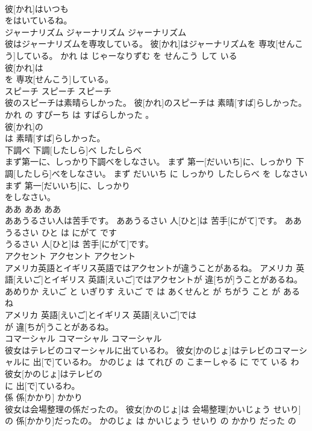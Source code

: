 \documentclass[8pt]{extreport}
\begin{document}
\begin{CJK}{UTF8}{min}
\\	彼[かれ]はいつも
\\	をはいているね。			
\\	ジャーナリズム	ジャーナリズム	ジャーナリズム	
\\	彼はジャーナリズムを専攻している。	彼[かれ]はジャーナリズムを 専攻[せんこう]している。	かれ は じゃーなりずむ を せんこう して いる	
\\	彼[かれ]は
\\	を 専攻[せんこう]している。			
\\	スピーチ	スピーチ	スピーチ	
\\	彼のスピーチは素晴らしかった。	彼[かれ]のスピーチは 素晴[すば]らしかった。	かれ の すぴーち は すばらしかった 。	
\\	彼[かれ]の
\\	は 素晴[すば]らしかった。			
\\	下調べ	下調[したしら]べ	したしらべ	
\\	まず第一に、しっかり下調べをしなさい。	まず 第一[だいいち]に、しっかり 下調[したしら]べをしなさい。	まず だいいち に しっかり したしらべ を しなさい	
\\	まず 第一[だいいち]に、しっかり
\\	をしなさい。			
\\	ああ	ああ	ああ	
\\	ああうるさい人は苦手です。	ああうるさい 人[ひと]は 苦手[にがて]です。	ああ うるさい ひと は にがて です	
\\	うるさい 人[ひと]は 苦手[にがて]です。			
\\	アクセント	アクセント	アクセント	
\\	アメリカ英語とイギリス英語ではアクセントが違うことがあるね。	アメリカ 英語[えいご]とイギリス 英語[えいご]ではアクセントが 違[ちが]うことがあるね。	あめりか えいご と いぎりす えいご で は あくせんと が ちがう こと が ある ね	
\\	アメリカ 英語[えいご]とイギリス 英語[えいご]では
\\	が 違[ちが]うことがあるね。			
\\	コマーシャル	コマーシャル	コマーシャル	
\\	彼女はテレビのコマーシャルに出ているわ。	彼女[かのじょ]はテレビのコマーシャルに 出[で]ているわ。	かのじょ は てれび の こまーしゃる に でて いる わ	
\\	彼女[かのじょ]はテレビの
\\	に 出[で]ているわ。			
\\	係	係[かかり]	かかり	
\\	彼女は会場整理の係だったの。	彼女[かのじょ]は 会場整理[かいじょう せいり]の 係[かかり]だったの。	かのじょ は かいじょう せいり の かかり だった の	

\end{CJK}
\end{document}
